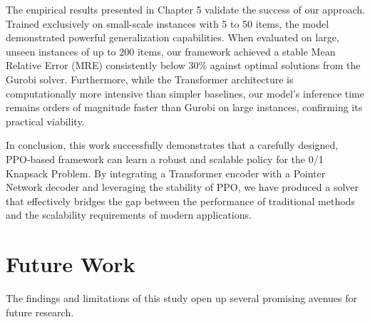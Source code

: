The empirical results presented in Chapter 5 validate the success of our approach. Trained exclusively on small-scale instances with 5 to 50 items, the model demonstrated powerful generalization capabilities. When evaluated on large, unseen instances of up to 200 items, our framework achieved a stable Mean Relative Error (MRE) consistently below 30\% against optimal solutions from the Gurobi solver. Furthermore, while the Transformer architecture is computationally more intensive than simpler baselines, our model's inference time remains orders of magnitude faster than Gurobi on large instances, confirming its practical viability.

In conclusion, this work successfully demonstrates that a carefully designed, PPO-based framework can learn a robust and scalable policy for the 0/1 Knapsack Problem. By integrating a Transformer encoder with a Pointer Network decoder and leveraging the stability of PPO, we have produced a solver that effectively bridges the gap between the performance of traditional methods and the scalability requirements of modern applications.

\section{Future Work}
\label{sec:future_work}

The findings and limitations of this study open up several promising avenues for future research.

